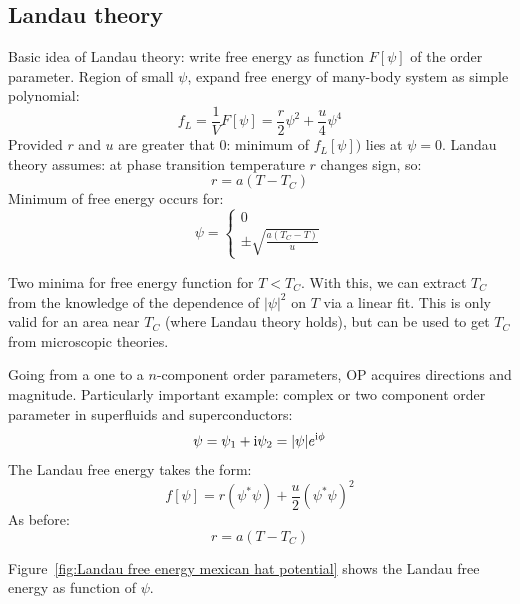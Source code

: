 \documentclass[../main.tex]{subfiles}
\begin{document}
\subsection{Landau theory}

Basic idea of Landau theory: write free energy as function \(F[\psi]\) of the order parameter.
Region of small \(\psi\), expand free energy of many-body system as simple polynomial:
\begin{equation}
    f_{L} = \frac{1}{V} F[\psi] = \frac{r}{2} \psi^2 + \frac{u}{4} \psi^4
\end{equation}
Provided \(r\) and \(u\) are greater that \(0\): minimum of \(f_L [\psi])\) lies at \(\psi = 0\).
Landau theory assumes: at phase transition temperature \(r\) changes sign, so:
\begin{equation}
    r = a(T - T_C)
\end{equation}
Minimum of free energy occurs for:
\begin{equation}
	\psi = \begin{cases}
		0 \\
		\pm \sqrt{\frac{a (T_C - T)}{u} }
	\end{cases}
\end{equation}

Two minima for free energy function for \(T < T_C\).
With this, we can extract \(T_C\) from the knowledge of the dependence of \(\vert \psi \vert^2\) on \(T\) via a linear fit.
This is only valid for an area near \(T_C\) (where Landau theory holds), but can be used to get \(T_C\) from microscopic theories.


Going from a one to a \(n\)-component order parameters, OP acquires directions and magnitude.
Particularly important example: complex or two component order parameter in superfluids and superconductors:
\begin{equation}
    \psi = \psi_1 + \mathrm{i} \psi_2 = \vert \psi \vert e^{\mathrm{i} \phi}
\end{equation}
The Landau free energy takes the form:
\begin{equation}
    f[\psi] = r(\psi^* \psi) + \frac{u}{2} (\psi^* \psi)^2
\end{equation}
As before:
\begin{equation}
    r = a(T - T_C)
\end{equation}

Figure~\ref{fig:Landau free energy mexican hat potential} shows the Landau free energy as function of \(\psi\).
\end{document}
